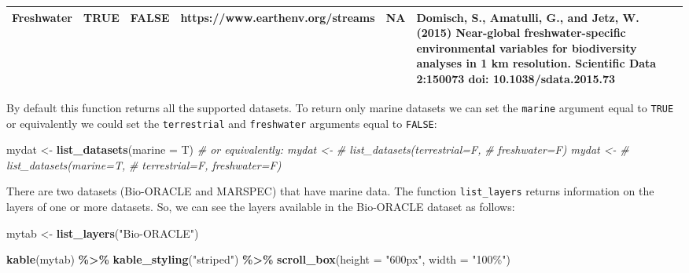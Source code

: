 \documentclass[
]{book}
\newenvironment{Shaded}{\begin{snugshade}}{\end{snugshade}}
\newcommand{\AttributeTok}[1]{\textcolor[rgb]{0.13,0.29,0.53}{#1}}
\newcommand{\CommentTok}[1]{\textcolor[rgb]{0.56,0.35,0.01}{\textit{#1}}}
\newcommand{\FunctionTok}[1]{\textcolor[rgb]{0.13,0.29,0.53}{\textbf{#1}}}
\newcommand{\NormalTok}[1]{#1}
\newcommand{\OtherTok}[1]{\textcolor[rgb]{0.56,0.35,0.01}{#1}}
\newcommand{\SpecialCharTok}[1]{\textcolor[rgb]{0.81,0.36,0.00}{\textbf{#1}}}
\newcommand{\StringTok}[1]{\textcolor[rgb]{0.31,0.60,0.02}{#1}}
\begin{document}
\begin{table}
\begin{tabular}{l|l|l|l|l|l}
\hline
Freshwater & TRUE & FALSE & https://www.earthenv.org/streams & NA & Domisch, S., Amatulli, G., and Jetz, W. (2015) Near-global freshwater-specific environmental variables for biodiversity analyses in 1 km resolution. Scientific Data 2:150073 doi: 10.1038/sdata.2015.73\\
\hline
\end{tabular}
\end{table}

By default this function returns all the supported datasets. To return only marine datasets we can set the \texttt{marine} argument equal to \texttt{TRUE} or equivalently we could set the \texttt{terrestrial} and \texttt{freshwater} arguments equal to \texttt{FALSE}:

\begin{Shaded}
\begin{Highlighting}[]
\NormalTok{mydat }\OtherTok{\textless{}{-}} \FunctionTok{list\_datasets}\NormalTok{(}\AttributeTok{marine =}\NormalTok{ T)}
\CommentTok{\# or equivalently: mydat \textless{}{-}}
\CommentTok{\# list\_datasets(terrestrial=F,}
\CommentTok{\# freshwater=F) mydat \textless{}{-}}
\CommentTok{\# list\_datasets(marine=T,}
\CommentTok{\# terrestrial=F, freshwater=F)}
\end{Highlighting}
\end{Shaded}

There are two datasets (Bio-ORACLE and MARSPEC) that have marine data. The function \texttt{list\_layers} returns information on the layers of one or more datasets. So, we can see the layers available in the Bio-ORACLE dataset as follows:

\begin{Shaded}
\begin{Highlighting}[]
\NormalTok{mytab }\OtherTok{\textless{}{-}} \FunctionTok{list\_layers}\NormalTok{(}\StringTok{"Bio{-}ORACLE"}\NormalTok{)}

\FunctionTok{kable}\NormalTok{(mytab) }\SpecialCharTok{\%\textgreater{}\%}
    \FunctionTok{kable\_styling}\NormalTok{(}\StringTok{"striped"}\NormalTok{) }\SpecialCharTok{\%\textgreater{}\%}
    \FunctionTok{scroll\_box}\NormalTok{(}\AttributeTok{height =} \StringTok{"600px"}\NormalTok{, }\AttributeTok{width =} \StringTok{"100\%"}\NormalTok{)}
\end{Highlighting}
\end{Shaded}
\end{document}
